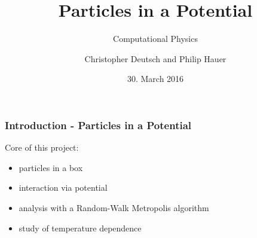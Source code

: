 \documentclass[mathserif,serif]{beamer}
\author{Christopher Deutsch and Philip Hauer}
\title{Particles in a Potential}
\date{30. March 2016}
\subtitle{{\small Computational Physics}}
\begin{document}
\frame[plain]{\titlepage}
\setcounter{framenumber}{0}
\begin{frame}
	\frametitle{Introduction - Particles in a Potential}
	
		
			Core of this project:
			\begin{itemize}
			\setlength\itemsep{1.5em}
				\item particles in a box
				\item interaction via potential
				\item analysis with a Random-Walk Metropolis algorithm
				\item study of temperature dependence
			\end{itemize}
			
\end{frame}





\end{document}
